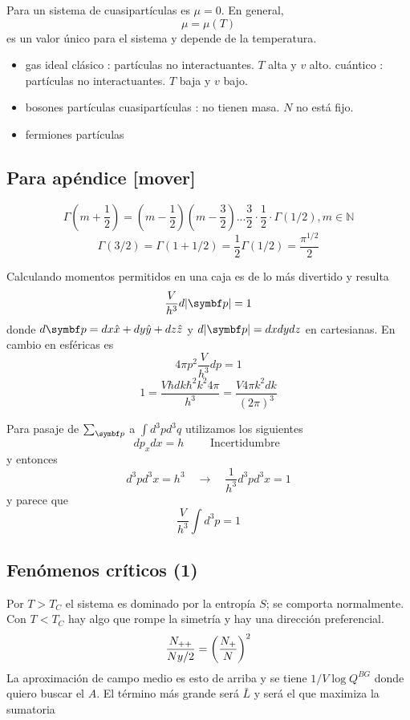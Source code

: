 \documentclass[10pt,oneside]{CBFT_book}
\begin{document}
Para un sistema de cuasipartículas es $\mu=0$. En general,
\[
	\mu = \mu(T)
\]
es un valor único para el sistema y depende de la temperatura.
\begin{itemize}
 \item gas ideal
 \subitem clásico : partículas no interactuantes. $T$ alta y $v$ alto.
 \subitem cuántico : partículas no interactuantes. $T$ baja y $v$ bajo.
 \item bosones 
 \subitem partículas
 \subitem cuasipartículas : no tienen masa. $N$ no está fijo.
 \item fermiones 
 \subitem partículas
\end{itemize}


\subsection{Para apéndice [mover]}

\[
	\Gamma \left( m +\frac{1}{2} \right) = \left( m -\frac{1}{2} \right) \left( m -\frac{3}{2} \right)
	... \frac{3}{2} \cdot \frac{1}{2} \cdot \Gamma(1/2), m \in \mathbb{N}
\]
\[
	\Gamma(3/2) = \Gamma(1+ 1/2) =\frac{1}{2} \Gamma(1/2) = \frac{\pi^{1/2}}{2}
\]

Calculando momentos permitidos en una caja es de lo más divertido y resulta 
\[
	\frac{V}{h^3} d|\vb{p}| = 1 
\]
donde $ d\vb{p} = dx \hat{x} + dy \hat{y}+ dz \hat{z}$ y $ d|\vb{p}| = dx dy dz $   en cartesianas.
En cambio en esféricas es
\[
	4 \pi p^2 \frac{V}{h^3} dp = 1
\]
\[
	1 = \frac{ V \hbar dk \hbar^2 k^2 4 \pi  }{ h^3 } = \frac{V 4\pi k^2 dk}{ (2\pi)^3 }
\]

Para pasaje de $\sum_{\vb{p}}$ a $\int d^3p d^3q $ utilizamos los siguientes 
\[
	dp_x dx  = h \qquad \text{ Incertidumbre }
\]
y entonces 
\[
	d^3p d^3x = h^3 \quad \to \quad \frac{1}{h^3 }d^3p d^3x = 1 
\]
y parece que 
\[
	\frac{V}{h^3} \int d^3 p = 1 
\]

\subsection{Fenómenos críticos (1)}

Por $ T > T_C $ el sistema  es dominado por la entropía $S$; se comporta normalmente. Con $ T < T_C $
hay algo que rompe la simetría y hay una dirección preferencial.
\[
	\frac{ N_{++} }{ N y/2 } = \left( \frac{  N_{+}  }{  N  } \right)^2
\]
La aproximación de campo medio es esto de arriba y se tiene $ 1/ V \log Q^{BG}$ donde quiero buscar el $A$.
El término más grande será $\bar{L}$ y será el que maximiza la sumatoria
\end{document}
